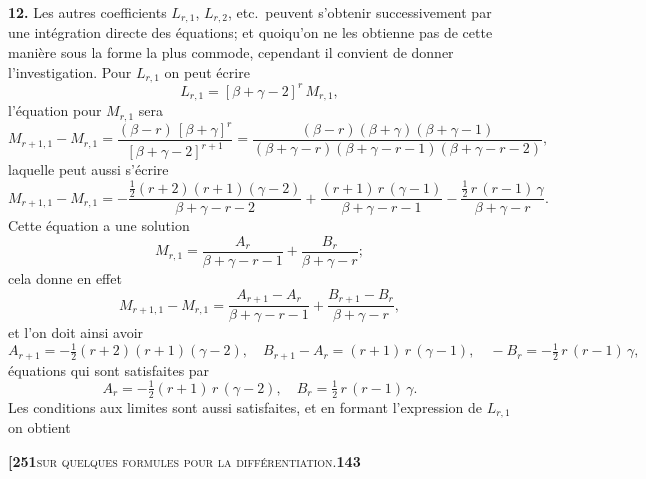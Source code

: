 \documentclass[11pt]{article}
\begin{document}
\medskip

\textbf{12.} Les autres coefficients $L_{r,1}$, $L_{r,2}$, etc.\ peuvent s'obtenir successivement par une intégration directe des équations; et quoiqu'on ne les obtienne pas de cette manière sous la forme la plus commode, cependant il convient de donner l'investigation. Pour $L_{r,1}$ on peut écrire
\[
L_{r,1} = [\beta + \gamma - 2]^{r}\,M_{r,1},
\]
l'équation pour $M_{r,1}$ sera
\[
M_{r+1,1} - M_{r,1} = \frac{(\beta - r)\,[\beta + \gamma]^{r}}{[\beta + \gamma - 2]^{r+1}} = \frac{(\beta - r)(\beta + \gamma)(\beta + \gamma - 1)}{(\beta + \gamma - r)(\beta + \gamma - r - 1)(\beta + \gamma - r - 2)},
\]
laquelle peut aussi s'écrire
\[
M_{r+1,1} - M_{r,1} = -\frac{\frac{1}{2}(r+2)(r+1)(\gamma-2)}{\beta + \gamma - r - 2} + \frac{(r+1)\,r\,(\gamma-1)}{\beta + \gamma - r - 1} - \frac{\frac{1}{2}\,r\,(r-1)\,\gamma}{\beta + \gamma - r}.
\]
Cette équation a une solution
\[
M_{r,1} = \frac{A_r}{\beta + \gamma - r - 1} + \frac{B_r}{\beta + \gamma - r};
\]
cela donne en effet
\[
M_{r+1,1} - M_{r,1} = \frac{A_{r+1} - A_r}{\beta + \gamma - r - 1} + \frac{B_{r+1} - B_r}{\beta + \gamma - r},
\]
et l'on doit ainsi avoir
\[
A_{r+1} = -\tfrac{1}{2}(r+2)(r+1)(\gamma-2),\quad B_{r+1} - A_r = (r+1)\,r\,(\gamma-1),\quad -B_r = -\tfrac{1}{2}\,r\,(r-1)\,\gamma,
\]
équations qui sont satisfaites par
\[
A_r = -\tfrac{1}{2}(r+1)\,r\,(\gamma-2),\quad B_r = \tfrac{1}{2}\,r\,(r-1)\,\gamma.
\]
Les conditions aux limites sont aussi satisfaites, et en formant l'expression de $L_{r,1}$ on obtient

\newpage

\noindent\textbf{[251}\hfill\textsc{sur quelques formules pour la différentiation.}\hfill\textbf{143}

\medskip
\end{document}
